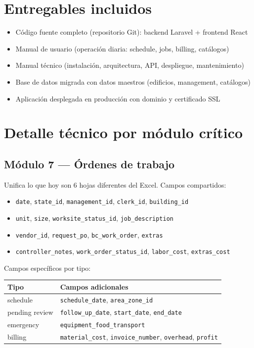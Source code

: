 \documentclass[11pt,a4paper]{article}
\begin{document}
\section{Entregables incluidos}

\begin{itemize}
    \item C\'odigo fuente completo (repositorio Git): backend Laravel + frontend React
    \item Manual de usuario (operaci\'on diaria: schedule, jobs, billing, cat\'alogos)
    \item Manual t\'ecnico (instalaci\'on, arquitectura, API, despliegue, mantenimiento)
    \item Base de datos migrada con datos maestros (edificios, management, cat\'alogos)
    \item Aplicaci\'on desplegada en producci\'on con dominio y certificado SSL
\end{itemize}

\section{Detalle t\'ecnico por m\'odulo cr\'itico}

\subsection{M\'odulo 7 --- \'Ordenes de trabajo}

Unifica lo que hoy son 6 hojas diferentes del Excel. Campos compartidos:

\begin{itemize}[noitemsep]
    \item \texttt{date}, \texttt{state\_id}, \texttt{management\_id}, \texttt{clerk\_id}, \texttt{building\_id}
    \item \texttt{unit}, \texttt{size}, \texttt{worksite\_status\_id}, \texttt{job\_description}
    \item \texttt{vendor\_id}, \texttt{request\_po}, \texttt{bc\_work\_order}, \texttt{extras}
    \item \texttt{controller\_notes}, \texttt{work\_order\_status\_id}, \texttt{labor\_cost}, \texttt{extras\_cost}
\end{itemize}

Campos espec\'ificos por tipo:

\begin{table}[h]
\centering
\small
\begin{tabular}{@{}ll@{}}
\toprule
\textbf{Tipo} & \textbf{Campos adicionales} \\
\midrule
schedule & \texttt{schedule\_date}, \texttt{area\_zone\_id} \\
pending review & \texttt{follow\_up\_date}, \texttt{start\_date}, \texttt{end\_date} \\
emergency & \texttt{equipment\_food\_transport} \\
billing & \texttt{material\_cost}, \texttt{invoice\_number}, \texttt{overhead}, \texttt{profit} \\
\bottomrule
\end{tabular}
\end{table}
\end{document}
